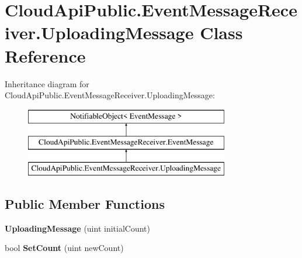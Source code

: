 \hypertarget{class_cloud_api_public_1_1_event_message_receiver_1_1_uploading_message}{\section{Cloud\-Api\-Public.\-Event\-Message\-Receiver.\-Uploading\-Message Class Reference}
\label{class_cloud_api_public_1_1_event_message_receiver_1_1_uploading_message}
}
Inheritance diagram for Cloud\-Api\-Public.\-Event\-Message\-Receiver.\-Uploading\-Message\-:\begin{figure}[H]
\begin{center}
\leavevmode
\includegraphics[height=3.000000cm]{class_cloud_api_public_1_1_event_message_receiver_1_1_uploading_message}
\end{center}
\end{figure}
\subsection*{Public Member Functions}
\begin{DoxyCompactItemize}
\item 
\hypertarget{class_cloud_api_public_1_1_event_message_receiver_1_1_uploading_message_ade593cdf958238271e24f2c7786e9925}{{\bfseries Uploading\-Message} (uint initial\-Count)}\label{class_cloud_api_public_1_1_event_message_receiver_1_1_uploading_message_ade593cdf958238271e24f2c7786e9925}

\item 
\hypertarget{class_cloud_api_public_1_1_event_message_receiver_1_1_uploading_message_a39c88e1356733ce4d4568e0f09ee2eae}{bool {\bfseries Set\-Count} (uint new\-Count)}\label{class_cloud_api_public_1_1_event_message_receiver_1_1_uploading_message_a39c88e1356733ce4d4568e0f09ee2eae}

\end{DoxyCompactItemize}
